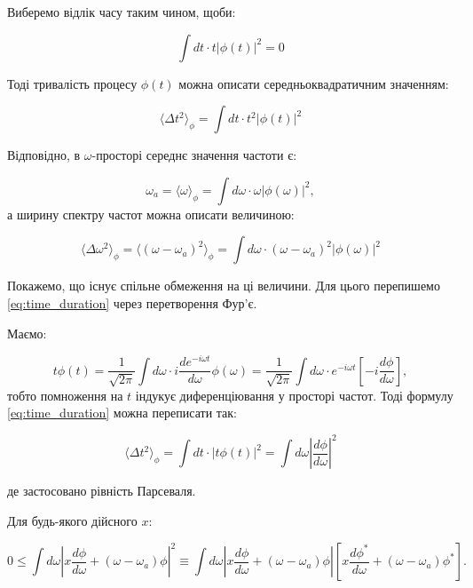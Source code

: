 Виберемо відлік часу таким чином, щоби:

\begin{equation*}
\int dt \cdot t |\phi(t)|^2 = 0
\end{equation*}

Тоді тривалість процесу \( \phi(t) \) можна описати середньоквадратичним значенням:

\begin{equation}
\langle \Delta t^2 \rangle_{\phi} = \int dt \cdot t^2 |\phi(t)|^2
\label{eq:time_duration}
\end{equation}

Відповідно, в \( \omega \)-просторі середнє значення частоти є:

\begin{equation*}
\omega_a = \langle \omega \rangle_{\phi} = \int d\omega \cdot \omega |\phi(\omega)|^2,
\end{equation*}
а ширину спектру частот можна описати величиною:

\begin{equation}
\langle \Delta \omega^2 \rangle_{\phi} = \langle (\omega - \omega_a)^2 \rangle_{\phi} = \int d\omega \cdot (\omega - \omega_a)^2 |\phi(\omega)|^2
\label{eq:frequency_width}
\end{equation}

Покажемо, що існує спільне обмеження на ці величини. Для цього перепишемо \eqref{eq:time_duration} через перетворення Фур’є.

Маємо:

\begin{equation*}
t \phi(t) = \frac{1}{\sqrt{2\pi}} \int d\omega \cdot i \frac{d e^{-i\omega t}}{d\omega} \phi(\omega) = \frac{1}{\sqrt{2\pi}} \int d\omega \cdot
e^{-i\omega t} \left[ -i \frac{d\phi}{d\omega} \right],
\end{equation*}
тобто помноження на \( t \) індукує диференціювання у просторі частот. Тоді формулу \eqref{eq:time_duration} можна переписати так:

\begin{equation}
\langle \Delta t^2 \rangle_{\phi} = \int dt \cdot |t \phi(t)|^2 = \int d\omega \left| \frac{d\phi}{d\omega} \right|^2
\label{eq:time_duration_fourier}
\end{equation}

де застосовано рівність Парсеваля.

Для будь-якого дійсного \( x \):

\begin{equation*}
0 \leq \int d\omega \left| x \frac{d\phi}{d\omega} + (\omega - \omega_a) \phi \right|^2 \equiv \int d\omega \left| x \frac{d\phi}{d\omega} + (\omega -
\omega_a) \phi \right| \left[ x \frac{d\phi^{*}}{d\omega} + (\omega - \omega_a) \phi^{*} \right].
\end{equation*}

